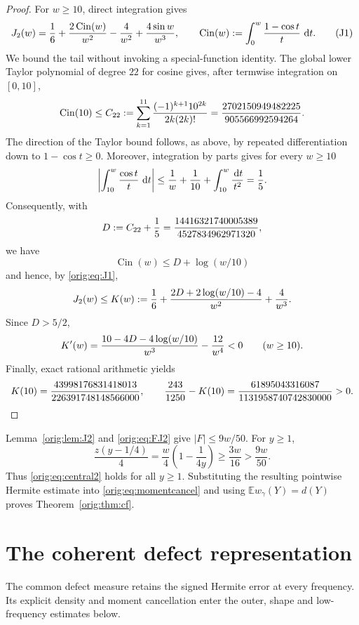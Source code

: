 \documentclass[11pt,a4paper]{article}
\numberwithin{equation}{section}
\theoremstyle{definition}
\theoremstyle{remark}
\newcommand{\E}{\mathbb E}
\newcommand{\dd}{\,\mathrm d}
\begin{document}
\begin{proof}
For $w\ge10$, direct integration gives
\[
 J_2(w)=\frac16+\frac{2\operatorname{Cin}(w)}{w^2}
 -\frac4{w^2}+\frac{4\sin w}{w^3},
 \qquad
 \operatorname{Cin}(w):=\int_0^w{1-\cos t\over t}\,\dd t.
                                                               \tag{J1}\label{orig:eq:J1}
\]
We bound the tail without invoking a special-function identity.  The global
lower Taylor polynomial of degree $22$ for cosine gives, after termwise
integration on $[0,10]$,
\[
 \operatorname{Cin}(10)\le
 C_{22}:=\sum_{k=1}^{11}{(-1)^{k+1}10^{2k}\over 2k(2k)!}
 ={2702150949482225\over905566992594264}.
\]
The direction of the Taylor bound follows, as above, by repeated
differentiation down to $1-\cos t\ge0$.  Moreover, integration by parts gives
for every $w\ge10$
\[
 \left|\int_{10}^w{\cos t\over t}\,\dd t\right|
 \le {1\over w}+{1\over10}+\int_{10}^w{\dd t\over t^2}
 ={1\over5}.
\]
Consequently, with
\[
 D:=C_{22}+\frac15
 ={14416321740005389\over4527834962971320},
\]
we have
\[
 \operatorname{Cin}(w)\le D+\log(w/10)
\]
and hence, by \eqref{orig:eq:J1},
\[
 J_2(w)\le K(w):=\frac16+
 {2D+2\log(w/10)-4\over w^2}+{4\over w^3}.
\]
Since $D>5/2$,
\[
 K'(w)={10-4D-4\log(w/10)\over w^3}-{12\over w^4}<0
 \qquad(w\ge10).
\]
Finally, exact rational arithmetic yields
\[
 K(10)={43998176831418013\over226391748148566000},
 \qquad
 {243\over1250}-K(10)
 ={61895043316087\over1131958740742830000}>0.
\]
\end{proof}

Lemma~\ref{orig:lem:J2} and \eqref{orig:eq:FJ2} give $|F|\le9w/50$.  For $y\ge1$,
\[
 \frac{z(y-1/4)}4=\frac w4\left(1-\frac1{4y}\right)
 \ge\frac{3w}{16}>\frac{9w}{50}.
\]
Thus \eqref{orig:eq:central2} holds for all $y\ge1$.  Substituting the resulting
pointwise Hermite estimate into \eqref{orig:eq:momentcancel} and using
$\E w_\gamma(Y)=d(Y)$ proves Theorem~\ref{orig:thm:cf}.

\section{The coherent defect representation}

The common defect measure retains the signed Hermite error at every
frequency. Its explicit density and moment cancellation enter the outer,
shape and low-frequency estimates below.
\end{document}
